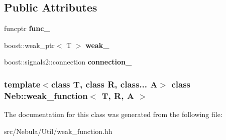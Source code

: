 \subsection*{\-Public \-Attributes}
\begin{DoxyCompactItemize}
\item 
\hypertarget{classNeb_1_1weak__function_a74862697c1231b8623d9e800f74cee8d}{funcptr {\bfseries func\-\_\-}}\label{classNeb_1_1weak__function_a74862697c1231b8623d9e800f74cee8d}

\item 
\hypertarget{classNeb_1_1weak__function_a9d75df0eaa7aaf40973f67f6583e5d69}{boost\-::weak\-\_\-ptr$<$ \-T $>$ {\bfseries weak\-\_\-}}\label{classNeb_1_1weak__function_a9d75df0eaa7aaf40973f67f6583e5d69}

\item 
\hypertarget{classNeb_1_1weak__function_a02370593823d9be862e4177a6d3b0edd}{boost\-::signals2\-::connection {\bfseries connection\-\_\-}}\label{classNeb_1_1weak__function_a02370593823d9be862e4177a6d3b0edd}

\end{DoxyCompactItemize}
\subsubsection*{template$<$class T, class R, class... \-A$>$ class Neb\-::weak\-\_\-function$<$ T, R, A $>$}



\-The documentation for this class was generated from the following file\-:\begin{DoxyCompactItemize}
\item 
src/\-Nebula/\-Util/weak\-\_\-function.\-hh\end{DoxyCompactItemize}
